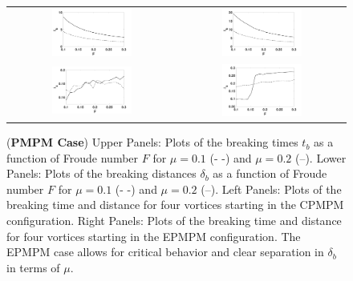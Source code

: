 \documentclass[a4paper,11pt]{article}
\begin{document}
\begin{figure}[!h]
\centering
\begin{tabular}{cc}
\includegraphics[width=0.5\textwidth]{froude_comp_pmpm} & \includegraphics[width=0.5\textwidth]{froude_comp_pmpm_sym}\\
\includegraphics[width=0.5\textwidth]{zmb_pmpm} & \includegraphics[width=0.5\textwidth]{zmb_pmpm_sym}
\end{tabular}
\caption{\small ({\bf PMPM Case}) Upper Panels: Plots of the breaking times $t_{b}$ as a function of Froude number $F$ for $\mu=0.1$ (- -) and $\mu=0.2$ (--).  Lower Panels: Plots of the breaking distances $\delta_{b}$ as a function of Froude number $F$ for $\mu=0.1$ (- -) and $\mu=0.2$ (--). Left Panels: Plots of the breaking time and distance for four vortices starting in the CPMPM configuration.  Right Panels: Plots of the breaking time and distance for four vortices starting in the EPMPM configuration.  The EPMPM case allows for critical behavior and clear separation in $\delta_{b}$ in terms of $\mu$.}
\label{fig:froudecomp_pmpm}
\end{figure}
\end{document}
